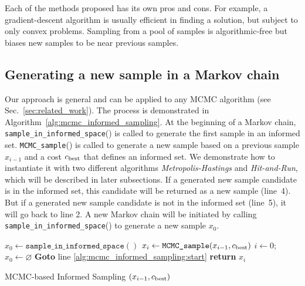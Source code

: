\documentclass[letterpaper, 10 pt, conference]{ieeeconf}  %
\begin{document}
Each of the methods proposed has its own pros and cons.
For example, a gradient-descent algorithm is usually efficient in finding a solution, but subject to only convex problems.
Sampling from a pool of samples is algorithmic-free but biases new samples to be near previous samples.


\subsection{Generating a new sample in a Markov chain}
\label{mcmc}

Our approach is general and can be applied to any MCMC algorithm (see Sec.~\ref{sec:related_work}).
The process is demonstrated in Algorithm~\ref{alg:mcmc_informed_sampling}.
At the beginning of a Markov chain, \texttt{sample\_in\_informed\_space}() is called to generate the first sample in an informed set.
\texttt{MCMC\_sample}() is called to generate a new sample based on a previous sample $ x_{i-1} $ and a cost $ c_{\rm best} $ that defines an informed set.
We demonstrate how to instantiate it with two different algorithms \emph{Metropolis-Hastings} and \emph{Hit-and-Run}, which will be described in later subsections.
If a generated new sample candidate is in the informed set, this candidate will be returned as a new sample (line~4).
But if a generated new sample candidate is not in the informed set (line~5), it will go back to line 2.
A new Markov chain will be initiated by calling \texttt{sample\_in\_informed\_space}() to generate a new sample $ x_0 $.

\begin{algorithm}[t]
	\begin{algorithmic}[1]
		\LOOP 
		\label{alg:mcmc_informed_sampling:start}
			\STATE $x_{0} \leftarrow \texttt{sample\_in\_informed\_space}( )$
		\ENDIF
		\STATE $x_{i} \leftarrow \texttt{MCMC\_sample} (x_{i-1}, c_{\rm best})$ 
			\STATE $ i \leftarrow 0 $; $ x_{0} \leftarrow \varnothing $
			\STATE \textbf{Goto} line \ref{alg:mcmc_informed_sampling:start} 
		\ENDIF
		\STATE \textbf{return} $x_{i}$
		\ENDLOOP 
	\end{algorithmic}
	\caption{\captionstyle MCMC-based Informed Sampling $( x_{i-1}, c_{\rm best})$}
	\label{alg:mcmc_informed_sampling}	
\end{algorithm}
\end{document}
